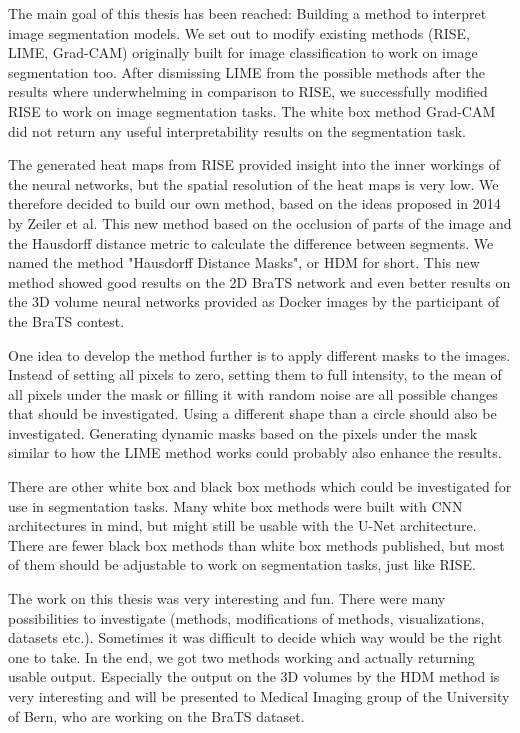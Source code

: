 The main goal of this thesis has been reached: Building a method to interpret image segmentation models. We set out to modify existing methods (RISE, LIME, Grad-CAM) originally built for image classification to work on image segmentation too. After dismissing LIME from the possible methods after the results where underwhelming in comparison to RISE, we successfully modified RISE to work on image segmentation tasks. The white box method Grad-CAM did not return any useful interpretability results on the segmentation task.

The generated heat maps from RISE provided insight into the inner workings of the neural networks, but the spatial resolution of the heat maps is very low. We therefore decided to build our own method, based on the ideas proposed in 2014 by Zeiler et al. This new method based on the occlusion of parts of the image and the Hausdorff distance metric to calculate the difference between segments. We named the method "Hausdorff Distance Masks", or HDM for short. This new method showed good results on the 2D BraTS network and even better results on the 3D volume neural networks provided as Docker images by the participant of the BraTS contest.

One idea to develop the method further is to apply different masks to the images. Instead of setting all pixels to zero, setting them to full intensity, to the mean of all pixels under the mask or filling it with random noise are all possible changes that should be investigated. Using a different shape than a circle should also be investigated. Generating dynamic masks based on the pixels under the mask similar to how the LIME method works could probably also enhance the results.

There are other white box and black box methods which could be investigated for use in segmentation tasks. Many white box methods were built with CNN architectures in mind, but might still be usable with the U-Net architecture. There are fewer black box methods than white box methods published, but most of them should be adjustable to work on segmentation tasks, just like RISE.

The work on this thesis was very interesting and fun. There were many possibilities to investigate (methods, modifications of methods, visualizations, datasets etc.). Sometimes it was difficult to decide which way would be the right one to take. In the end, we got two methods working and actually returning usable output. Especially the output on the 3D volumes by the HDM method is very interesting and will be presented to Medical Imaging group of the University of Bern, who are working on the BraTS dataset.
